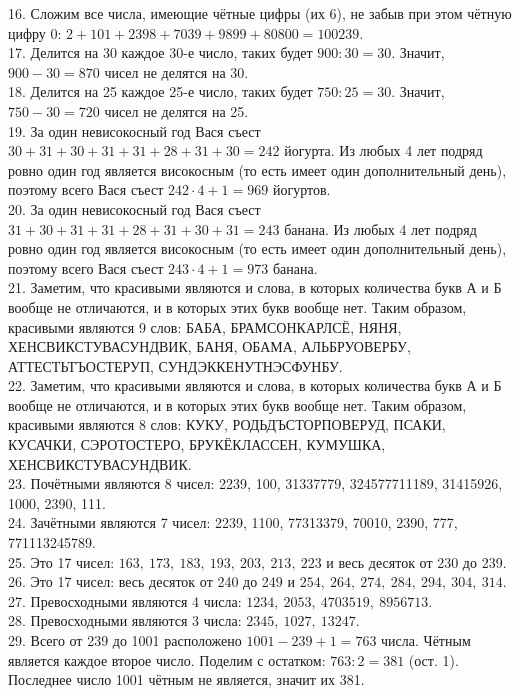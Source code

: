 16. Сложим все числа, имеющие чётные цифры (их 6), не забыв при этом чётную цифру 0: $2+101+2398+7039+9899+80800=100239.$\\
17. Делится на 30 каждое 30-е число, таких будет $900:30=30.$ Значит, $900-30=870$ чисел не делятся на 30.\\
18. Делится на 25 каждое 25-е число, таких будет $750:25=30.$ Значит, $750-30=720$ чисел не делятся на 25.\\
19. За один невисокосный год Вася съест $30+31+30+31+31+28+31+30=242$ йогурта. Из любых 4 лет подряд ровно один год является високосным (то есть имеет один дополнительный день), поэтому всего Вася съест $242\cdot4+1=969$ йогуртов.\\
20. За один невисокосный год Вася съест $31+30+31+31+28+31+30+31=243$ банана. Из любых 4 лет подряд ровно один год является високосным (то есть имеет один дополнительный день), поэтому всего Вася съест $243\cdot4+1=973$ банана.\\
21. Заметим, что красивыми являются и слова, в которых количества букв А и Б вообще не отличаются, и в которых этих букв вообще нет. Таким образом, красивыми являются 9 слов: БАБА, БРАМСОНКАРЛСЁ, НЯНЯ, ХЕНСВИКСТУВАСУНДВИК, БАНЯ, ОБАМА, АЛЬБРУОВЕРБУ, АТТЕСТЬТЪОСТЕРУП, СУНДЭККЕНУТНЭСФУНБУ.\\
22. Заметим, что красивыми являются и слова, в которых количества букв А и Б вообще не отличаются, и в которых этих букв вообще нет. Таким образом, красивыми являются 8 слов: КУКУ, РОДЬДЪСТОРПОВЕРУД, ПСАКИ, КУСАЧКИ, СЭРОТОСТЕРО, БРУКЁКЛАССЕН, КУМУШКА, ХЕНСВИКСТУВАСУНДВИК.\\
23. Почётными являются 8 чисел: 2239, 100, 31337779, 324577711189, 31415926, 1000, 2390, 111.\\
24. Зачётными являются 7 чисел: 2239, 1100, 77313379, 70010, 2390, 777, 771113245789.\\
25. Это 17 чисел: $163,\ 173,\ 183,\ 193,\ 203,\ 213,\ 223$ и весь десяток от 230 до 239.\\
26. Это 17 чисел: весь десяток от 240 до 249 и $254,\ 264,\ 274,\ 284,\ 294,\ 304,\ 314.$\\
27. Превосходными являются 4 числа: $1234,\ 2053,\ 4703519,\ 8956713.$\\
28. Превосходными являются 3 числа: $2345,\ 1027,\ 13247.$\\
29. Всего от 239 до 1001 расположено $1001-239+1=763$ числа. Чётным является каждое второе число. Поделим с остатком: $763:2=381$ (ост. 1). Последнее число 1001 чётным не является, значит их 381.\\
